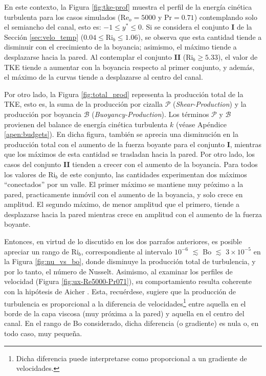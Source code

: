 En este contexto, la Figura \ref{fig:tke-prof} muestra el perfil de la energía cinética turbulenta para los casos simulados ($\text{Re}_o=5000$ y $\text{Pr}=0\text{.}71$) contemplando solo el semiancho del canal, esto es: $-1 \leqslant y^* \leqslant 0$. Si se considera el conjunto \textbf{I} de la Sección \ref{sec:velo_temp} ($0\text{.}04 \leq \text{Ri}_b \leq 1\text{.}06$), se observa que esta cantidad tiende a disminuir con el crecimiento de la boyancia; asimismo, el máximo tiende a desplazarse hacia la pared. Al contemplar el conjunto \textbf{II} ($\text{Ri}_b \geq 5\text{.}33$), el valor de TKE tiende a aumentar con la boyancia respecto al primer conjunto, y además, el máximo de la curvas tiende a desplazarse al centro del canal.

Por otro lado, la Figura \ref{fig:total_prod} representa la producción total de la TKE, esto es, la suma de la producción por cizalla $\mathcal{P}$ (\textit{Shear-Production}) y la producción por boyancia $\mathcal{B}$ (\textit{Buoyancy-Production}). Los términos $\mathcal{P}$ y $\mathcal{B}$ provienen del balance de energía cinética turbulenta $k$  (véase Apéndice \ref{apen:budgets}). En dicha figura, también se aprecia una disminución en la producción total con el aumento de la fuerza boyante para el conjunto \textbf{I}, mientras que los máximos de esta cantidad se trasladan hacia la pared. Por otro lado, los casos del conjunto \textbf{II} tienden a crecer con el aumento de la boyancia. Para todos los valores de $\text{Ri}_b$ de este conjunto, las cantidades experimentan dos máximos ``conectados'' por un valle. El primer máximo se mantiene muy próximo a la pared, practicamente inmóvil con el aumento de la boyancia, y solo crece en amplitud. El segundo máximo, de menor amplitud que el primero, tiende a desplazarse hacia la pared mientras crece en amplitud con el aumento de la fuerza boyante.

Entonces, en virtud de lo discutido en los dos parrafos anteriores, es posible apreciar un rango de Ri$_b$, correspondiente al intervalo $10^{-6}$ $\lesssim$ Bo $\lesssim$ $3 \times 10^{-5}$ en la Figura \ref{fig:nu_vs_bo}, donde disminuye la producción total de turbulencia, y por lo tanto, el número de Nusselt. Asimismo, al examinar los perfiles de velocidad (Figura \ref{fig:ux-Re5000-Pr071}), su comportamiento resulta coherente con la hipótesis de Aicher \cite{aicher1997}. Esta, recuérdese, sugiere que la producción de turbulencia es proporcional a la diferencia de velocidades\footnote{Dicha diferencia puede interpretarse como proporcional a un gradiente de velocidades.} entre aquella en el borde de la capa viscosa (muy próxima a la pared) y aquella en el centro del canal. En el rango de Bo considerado, dicha diferencia (o gradiente) es nula o, en todo caso, muy pequeña.

